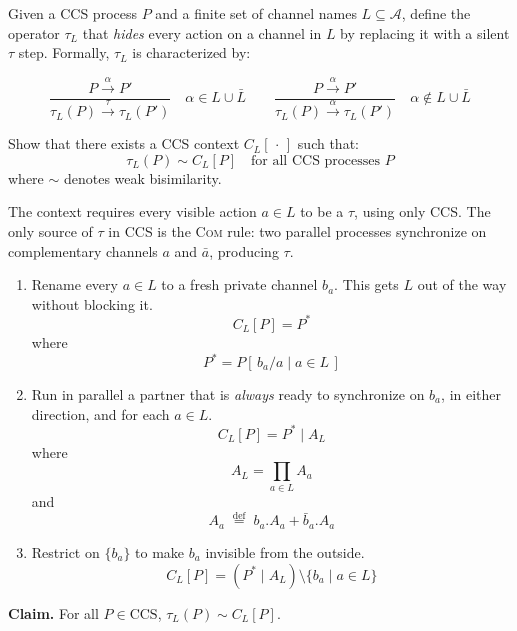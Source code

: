\documentclass{article}
\begin{document}
Given a CCS process $P$ and a finite set of channel names $L \subseteq \mathcal{A}$,
define the operator $\tau_L$ that \emph{hides} every action on a channel in $L$
by replacing it with a silent $\tau$ step. Formally, $\tau_L$ is characterized by:

\[
  \frac{P \xrightarrow{\alpha} P'}{\tau_L(P) \xrightarrow{\tau} \tau_L(P')}
  \quad \alpha \in L \cup \bar{L}
  \qquad
  \frac{P \xrightarrow{\alpha} P'}{\tau_L(P) \xrightarrow{\alpha} \tau_L(P')}
  \quad \alpha \notin L \cup \bar{L}
\]

Show that there exists a CCS context $C_L[\,\cdot\,]$ such that:
\[
\tau_L(P) \sim C_L[P]
\quad \text{for all CCS processes } P
\]
where $\sim$ denotes weak bisimilarity.

The context requires every visible action $a \in L$ to be a $\tau$, using only CCS.
The only source of $\tau$ in CCS is the \textsc{Com} rule: two parallel processes 
synchronize on complementary channels $a$ and $\bar{a}$, producing $\tau$. 

\begin{enumerate}
  \item Rename every $a \in L$ to a fresh private channel $b_a$.
        This gets $L$ out of the way without blocking it.
        \[C_L[P] = P^*\]
        where
        \[P^* = P[\,b_a/a \mid a \in L\,]\]
  \item Run in parallel a partner that is \emph{always} ready to synchronize 
        on $b_a$, in either direction, and for each $a \in L$. 
        \[C_L[P] = P^* \mid A_L\]
        where
        \[A_L = \prod_{a \in L} A_a\]
        and
        \[ A_a \;\overset{\text{def}}{=}\; b_a.A_a + \bar{b}_a.A_a \]
  \item Restrict on $\{b_a\}$ to make $b_a$ invisible from the outside.
        \[ C_L[P] = (P^* \mid A_L)\setminus\{b_a \mid a \in L\} \]
\end{enumerate}

\textbf{Claim.} For all $P \in \text{CCS}$, $\tau_L(P) \sim C_L[P]$.
\end{document}
